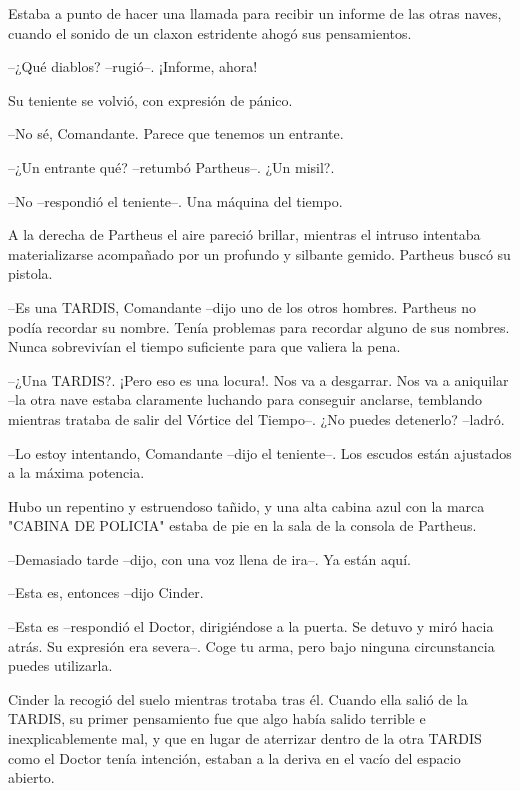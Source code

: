 Estaba a punto de hacer una llamada para recibir un informe de las otras naves, cuando el sonido de un claxon estridente ahogó sus pensamientos. 



--¿Qué diablos? --rugió--. ¡Informe, ahora!



Su teniente se volvió, con expresión de pánico. 



--No sé, Comandante. Parece que tenemos un entrante.

--¿Un entrante qué? --retumbó Partheus--. ¿Un misil?.

--No --respondió el teniente--. Una máquina del tiempo.



A la derecha de Partheus el aire pareció brillar, mientras el intruso intentaba materializarse acompañado por un profundo y silbante gemido. Partheus buscó su pistola.



--Es una TARDIS, Comandante --dijo uno de los otros hombres. Partheus no podía recordar su nombre. Tenía problemas para recordar alguno de sus nombres. Nunca sobrevivían el tiempo suficiente para que valiera la pena.

--¿Una TARDIS?. ¡Pero eso es una locura!. Nos va a desgarrar. Nos va a aniquilar --la otra nave estaba claramente luchando para conseguir anclarse, temblando mientras trataba de salir del Vórtice del Tiempo--. ¿No puedes detenerlo? --ladró.

--Lo estoy intentando, Comandante --dijo el teniente--. Los escudos están ajustados a la máxima potencia.



Hubo un repentino y estruendoso tañido, y una alta cabina azul con la marca "CABINA DE POLICIA" estaba de pie en la sala de la consola de Partheus.



--Demasiado tarde --dijo, con una voz llena de ira--. Ya están aquí.

--Esta es, entonces --dijo Cinder.

--Esta es --respondió el Doctor, dirigiéndose a la puerta. Se detuvo y miró hacia atrás. Su expresión era severa--. Coge tu arma, pero bajo ninguna circunstancia puedes utilizarla.



Cinder la recogió del suelo mientras trotaba tras él. Cuando ella salió de la TARDIS, su primer pensamiento fue que algo había salido terrible e inexplicablemente mal, y que en lugar de aterrizar dentro de la otra TARDIS como el Doctor tenía intención, estaban a la deriva en el vacío del espacio abierto.

